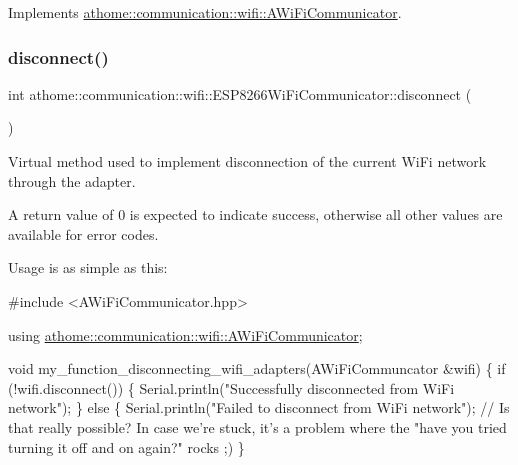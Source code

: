 Implements \mbox{\hyperlink{classathome_1_1communication_1_1wifi_1_1_a_wi_fi_communicator_ac81395d55c9a6824136d7b63fdb096f0}{athome\+::communication\+::wifi\+::\+A\+Wi\+Fi\+Communicator}}.

\mbox{\label{classathome_1_1communication_1_1wifi_1_1_e_s_p8266_wi_fi_communicator_a7e53e10b858aebc5e7c6c0ea6007f84a}} 
\subsubsection{\texorpdfstring{disconnect()}{disconnect()}}
{\footnotesize\ttfamily int athome\+::communication\+::wifi\+::\+E\+S\+P8266\+Wi\+Fi\+Communicator\+::disconnect (\begin{DoxyParamCaption}{ }\end{DoxyParamCaption})\hspace{0.3cm}{\ttfamily [virtual]}}

Virtual method used to implement disconnection of the current Wi\+Fi network through the adapter.

A return value of 0 is expected to indicate success, otherwise all other values are available for error codes.

Usage is as simple as this\+:


\begin{DoxyCode}
\textcolor{preprocessor}{#include <AWiFiCommunicator.hpp>}

\textcolor{keyword}{using} \mbox{\hyperlink{classathome_1_1communication_1_1wifi_1_1_a_wi_fi_communicator}{athome::communication::wifi::AWiFiCommunicator}};

\textcolor{keywordtype}{void} my\_function\_disconnecting\_wifi\_adapters(AWiFiCommuncator &wifi) \{
  \textcolor{keywordflow}{if} (!wifi.disconnect()) \{
    Serial.println(\textcolor{stringliteral}{"Successfully disconnected from WiFi network"});
  \} \textcolor{keywordflow}{else} \{
    Serial.println(\textcolor{stringliteral}{"Failed to disconnect from WiFi network"}); \textcolor{comment}{// Is that really possible? In case we're
       stuck, it's a problem where the "have you tried turning it off and on again?" rocks ;)}
\}
\end{DoxyCode}
 


